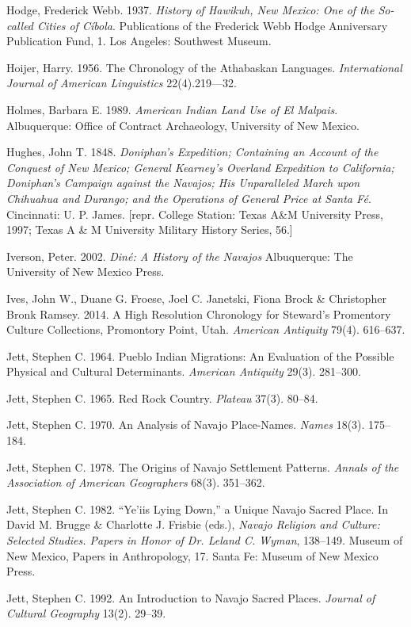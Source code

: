Hodge, Frederick Webb. 1937.  \textit{History of Hawikuh, New Mexico: One of the So-called Cities of Cíbola}. Publications of the Frederick Webb Hodge Anniversary Publication Fund, 1.  Los Angeles:  Southwest Museum.

Hoijer, Harry. 1956. The Chronology of the Athabaskan Languages. \textit{International Journal of American Linguistics} 22(4).219—32.

Holmes, Barbara E. 1989. \textit{American Indian Land Use of El Malpais}. Albuquerque: Office of Contract Archaeology, University of New Mexico.

Hughes, John T. 1848. \textit{Doniphan’s Expedition; Containing an Account of the Conquest of New Mexico; General Kearney’s Overland Expedition to California; Doniphan’s Campaign against the Navajos; His Unparalleled March upon Chihuahua and Durango; and the Operations of General Price at Santa Fé}.  Cincinnati:  U. P. James.  [repr. College Station:  Texas A\&M University Press, 1997; Texas A \& M University Military History Series, 56.]

Iverson, Peter. 2002. \textit{Diné: A History of the Navajos}  Albuquerque:  The University of New Mexico Press.

Ives, John W., Duane G. Froese, Joel C. Janetski, Fiona Brock \& Christopher Bronk Ramsey.  2014.  A High Resolution Chronology for Steward’s Promentory Culture Collections, Promontory Point, Utah.  \textit{American Antiquity} 79(4). 616--637.

Jett, Stephen C.  1964.  Pueblo Indian Migrations: An Evaluation of the Possible Physical and Cultural Determinants.  \textit{American Antiquity} 29(3). 281--300.


Jett, Stephen C.  1965.  Red Rock Country.  \textit{Plateau} 37(3). 80--84.

Jett, Stephen C. 1970.  An Analysis of Navajo Place-Names.  \textit{Names} 18(3). 175--184.

Jett, Stephen C.  1978.  The Origins of Navajo Settlement Patterns.  \textit{Annals of the Association of American Geographers} 68(3). 351--362.

Jett, Stephen C.  1982.  “Ye’iis Lying Down,” a Unique Navajo Sacred Place.  In   David M. Brugge \& Charlotte J. Frisbie (eds.), \textit{Navajo Religion and Culture: Selected Studies. Papers in Honor of Dr. Leland C. Wyman}, 138--149.   Museum of New Mexico, Papers in Anthropology, 17.  Santa Fe:  Museum of New Mexico Press.

Jett, Stephen C.  1992.  An Introduction to Navajo Sacred Places.  \textit{Journal of Cultural Geography} 13(2). 29--39.

